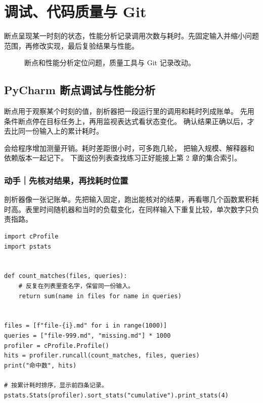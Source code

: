 \chapter{调试、代码质量与 Git}
\label{ch:08-outline}

断点呈现某一时刻的状态，性能分析记录调用次数与耗时。先固定输入并缩小问题范围，再修改实现，最后复验结果与性能。


\begin{figure}[htbp]
  \centering
  \caption*{断点和性能分析定位问题，质量工具与 Git 记录改动。}
\end{figure}


\section{PyCharm 断点调试与性能分析}

断点用于观察某个时刻的值，剖析器把一段运行里的调用和耗时列成账单。
先用条件断点停在目标任务上，再用监视表达式看状态变化。
确认结果正确以后，才去比同一份输入上的累计耗时。

 会给程序增加测量开销。耗时差距很小时，可多跑几轮，
把输入规模、解释器和依赖版本一起记下。
下面这份列表查找练习正好能接上第 2 章的集合索引。

\subsection*{动手｜先核对结果，再找耗时位置}

剖析器像一张记账单。先把输入固定，跑出能核对的结果，再看哪几个函数累积耗时高。表里时间随机器和当时的负载变化，在同样输入下重复比较，单次数字只负责指路。

\begin{lstlisting}[title={\code{profile_lookup.py}}]
import cProfile
import pstats


def count_matches(files, queries):
    # 反复在列表里查名字，保留同一份输入。
    return sum(name in files for name in queries)


files = [f"file-{i}.md" for i in range(1000)]
queries = ["file-999.md", "missing.md"] * 1000
profiler = cProfile.Profile()
hits = profiler.runcall(count_matches, files, queries)
print("命中数", hits)

# 按累计耗时排序，显示前四条记录。
pstats.Stats(profiler).sort_stats("cumulative").print_stats(4)
\end{lstlisting}


